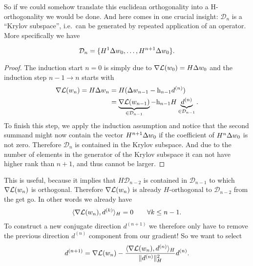 So if we could somehow translate this euclidean orthogonality into a
H-orthogonality we would be done. And here comes in one crucial insight:
\(\mathcal{D}_n\) is a ``Krylov subspace'', i.e.\ can be generated by repeated
application of an operator. More specifically we have
\begin{lemma}
	\begin{align*}
		\mathcal{D}_n = \{H^1 \Delta w_0, \dots, H^{n+1}\Delta w_0\}.
	\end{align*}
\end{lemma}
\begin{proof}
	The induction start \(n=0\) is simply due to \(\nabla\mathcal{L}(w_0) =
	H\Delta w_0\) and the induction step \(n-1\to n\) starts with
	\begin{align}
		\nonumber
		\nabla\mathcal{L}(w_n)= H\Delta w_n
		&= H(\Delta w_{n-1} - \text{h}_{n-1} d^{(n)})\\
		\label{eq: represent nabla Loss(weights_n) with prev gradient and d(n)}
		&= \underbrace{\nabla\mathcal{L}(w_{n-1})}_{\in \mathcal{D}_{n-1}} - \text{h}_{n-1} H
		\underbrace{d^{(n)}}_{\in \mathcal{D}_{n-1}}.
	\end{align}
	To finish this step, we apply the induction assumption and notice that the
	second summand might now contain the vector \(H^{n+1}\Delta w_0\) if the
	coefficient of \(H^{n}\Delta w_0\) is not zero. Therefore
	\(\mathcal{D}_{n}\) is contained in the Krylov subspace. And due to the
	number of elements in the generator of the Krylov subspace it can not have
	higher rank than \(n+1\), and thus cannot be larger.
\end{proof}
This is useful, because it implies that \(H\mathcal{D}_{n-2}\) is contained
in \(\mathcal{D}_{n-1}\) to which \(\nabla\mathcal{L}(w_n)\) is orthogonal.
Therefore \(\nabla\mathcal{L}(w_n)\) is already \(H\)-orthogonal to
\(\mathcal{D}_{n-2}\) from the get go. In other words we already have
\begin{align*}
	\langle \nabla\mathcal{L}(w_n), d^{(k)} \rangle_H = 0 
	\qquad \forall k\le n-1.
\end{align*}
To construct a new conjugate direction \(d^{(n+1)}\) we therefore only have to
remove the previous direction \(d^{(n)}\) component from our gradient! So we
want to select
\begin{align}\label{eq: next search direction}
	d^{(n+1)} = \nabla\mathcal{L}(w_n)
	- \frac{\langle \nabla\mathcal{L}(w_n), d^{(n)}\rangle_H}{\|d^{(n)}\|_H^2}d^{(n)}.
\end{align}


